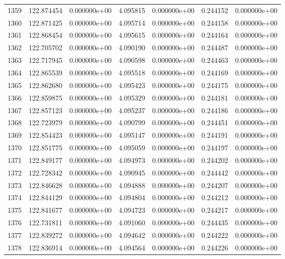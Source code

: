 \begin{tabular}{rrrrrrr}
1359 & 122.874454 &  0.000000e+00 &  4.095815 &  0.000000e+00 &    0.244152 &  0.000000e+00 \\
1360 & 122.871425 &  0.000000e+00 &  4.095714 &  0.000000e+00 &    0.244158 &  0.000000e+00 \\
1361 & 122.868454 &  0.000000e+00 &  4.095615 &  0.000000e+00 &    0.244164 &  0.000000e+00 \\
1362 & 122.705702 &  0.000000e+00 &  4.090190 &  0.000000e+00 &    0.244487 &  0.000000e+00 \\
1363 & 122.717945 &  0.000000e+00 &  4.090598 &  0.000000e+00 &    0.244463 &  0.000000e+00 \\
1364 & 122.865539 &  0.000000e+00 &  4.095518 &  0.000000e+00 &    0.244169 &  0.000000e+00 \\
1365 & 122.862680 &  0.000000e+00 &  4.095423 &  0.000000e+00 &    0.244175 &  0.000000e+00 \\
1366 & 122.859875 &  0.000000e+00 &  4.095329 &  0.000000e+00 &    0.244181 &  0.000000e+00 \\
1367 & 122.857123 &  0.000000e+00 &  4.095237 &  0.000000e+00 &    0.244186 &  0.000000e+00 \\
1368 & 122.723979 &  0.000000e+00 &  4.090799 &  0.000000e+00 &    0.244451 &  0.000000e+00 \\
1369 & 122.854423 &  0.000000e+00 &  4.095147 &  0.000000e+00 &    0.244191 &  0.000000e+00 \\
1370 & 122.851775 &  0.000000e+00 &  4.095059 &  0.000000e+00 &    0.244197 &  0.000000e+00 \\
1371 & 122.849177 &  0.000000e+00 &  4.094973 &  0.000000e+00 &    0.244202 &  0.000000e+00 \\
1372 & 122.728342 &  0.000000e+00 &  4.090945 &  0.000000e+00 &    0.244442 &  0.000000e+00 \\
1373 & 122.846628 &  0.000000e+00 &  4.094888 &  0.000000e+00 &    0.244207 &  0.000000e+00 \\
1374 & 122.844129 &  0.000000e+00 &  4.094804 &  0.000000e+00 &    0.244212 &  0.000000e+00 \\
1375 & 122.841677 &  0.000000e+00 &  4.094723 &  0.000000e+00 &    0.244217 &  0.000000e+00 \\
1376 & 122.731811 &  0.000000e+00 &  4.091060 &  0.000000e+00 &    0.244435 &  0.000000e+00 \\
1377 & 122.839272 &  0.000000e+00 &  4.094642 &  0.000000e+00 &    0.244222 &  0.000000e+00 \\
1378 & 122.836914 &  0.000000e+00 &  4.094564 &  0.000000e+00 &    0.244226 &  0.000000e+00 \\

\end{tabular}
